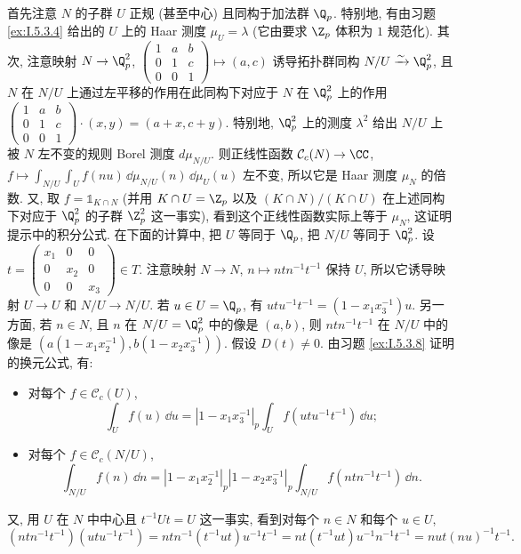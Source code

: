 \begin{solution}
首先注意 $N$ 的子群 $U$ 正规 (甚至中心) 且同构于加法群 $\Q_p$. 特别地, 有由习题 \ref{ex:I.5.3.4} 给出的 $U$ 上的 Haar 测度 $\mu_U = \lambda$ (它由要求 $\Z_p$ 体积为 $1$ 规范化).
其次, 注意映射 $N \to \Q_p^2$, $\begin{pmatrix} 1 & a & b \\ 0 & 1 & c \\ 0 & 0 & 1 \end{pmatrix} \longmapsto (a, c)$ 诱导拓扑群同构 $N/U \xrightarrow{\sim} \Q_p^2$, 且 $N$ 在 $N/U$ 上通过左平移的作用在此同构下对应于 $N$ 在 $\Q_p^2$ 上的作用 $\begin{pmatrix} 1 & a & b \\ 0 & 1 & c \\ 0 & 0 & 1 \end{pmatrix} \cdot (x, y) = (a + x, c + y)$. 特别地, $\Q_p^2$ 上的测度 $\lambda^2$ 给出 $N/U$ 上被 $N$ 左不变的规则 Borel 测度 $d\mu_{N/U}$. 则正线性函数 $\mathcal{C}_c(N) \to \CC$, $f \longmapsto \int_{N/U}\int_U f(nu)\,\dd\mu_{N/U}(n)\,\dd\mu_U(u)$ 左不变, 所以它是 Haar 测度 $\mu_N$ 的倍数. 又, 取 $f = \mathbb{1}_{K \cap N}$ (并用 $K \cap U = \Z_p$ 以及 $(K \cap N)/(K \cap U)$ 在上述同构下对应于 $\Q_p^2$ 的子群 $\Z_p^2$ 这一事实), 看到这个正线性函数实际上等于 $\mu_N$, 这证明提示中的积分公式.
在下面的计算中, 把 $U$ 等同于 $\Q_p$, 把 $N/U$ 等同于 $\Q_p^2$. 设 $t = \begin{pmatrix} x_1 & 0 & 0 \\ 0 & x_2 & 0 \\ 0 & 0 & x_3 \end{pmatrix} \in T$. 注意映射 $N \to N$, $n \longmapsto ntn^{-1}t^{-1}$ 保持 $U$, 所以它诱导映射 $U \to U$ 和 $N/U \to N/U$. 若 $u \in U = \Q_p$, 有 $utu^{-1}t^{-1} = (1 - x_1x_3^{-1})u$. 另一方面, 若 $n \in N$, 且 $n$ 在 $N/U = \Q_p^2$ 中的像是 $(a, b)$, 则 $ntn^{-1}t^{-1}$ 在 $N/U$ 中的像是 $(a(1 - x_1x_2^{-1}), b(1 - x_2x_3^{-1}))$.
假设 $D(t) \neq 0$. 由习题 \ref{ex:I.5.3.8} 证明的换元公式, 有:
\begin{itemize}
\item 对每个 $f \in \mathcal{C}_c(U)$,
\[
\int_U f(u)\,\dd u = |1 - x_1x_3^{-1}|_p\int_U f(utu^{-1}t^{-1})\,\dd u;
\]
\item 对每个 $f \in \mathcal{C}_c(N/U)$,
\[
\int_{N/U}f(n)\,\dd n = |1 - x_1x_2^{-1}|_p|1 - x_2x_3^{-1}|_p\int_{N/U}f(ntn^{-1}t^{-1})\,\dd n.
\]
\end{itemize}
又, 用 $U$ 在 $N$ 中中心且 $t^{-1}Ut = U$ 这一事实, 看到对每个 $n \in N$ 和每个 $u \in U$,
\[
(ntn^{-1}t^{-1})(utu^{-1}t^{-1}) = ntn^{-1}(t^{-1}ut)u^{-1}t^{-1} = nt(t^{-1}ut)u^{-1}n^{-1}t^{-1} = nut(nu)^{-1}t^{-1}.
\]
\end{solution}
